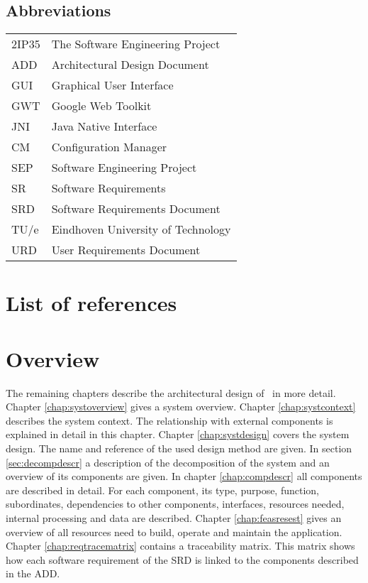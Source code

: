 \subsection{Abbreviations}
\begin{tabular}{l|l}
2IP35 & The Software Engineering Project \\
ADD & Architectural Design Document \\
GUI & Graphical User Interface \\
GWT & Google Web Toolkit \\
JNI & Java Native Interface \\
CM    & Configuration Manager \\
SEP   & Software Engineering Project \\
SR    & Software Requirements \\
SRD   & Software Requirements Document \\
TU/e  & Eindhoven University of Technology \\
URD   & User Requirements Document \\
\end{tabular}

\section{List of references}


\section{Overview}
The remaining chapters describe the architectural design of \projectname\ in more detail. Chapter \ref{chap:systoverview} gives a system overview. Chapter \ref{chap:systcontext} describes the system context. The relationship with external components is explained in detail in this chapter. Chapter \ref{chap:systdesign} covers the system design. The name and reference of the used design method are given. In section \ref{sec:decompdescr} a description of the decomposition of the system and an overview of its components are given.
In chapter \ref{chap:compdescr} all components are described in detail. For each component, its type, purpose, function, subordinates, dependencies to other components, interfaces, resources needed, internal processing and  data are described. Chapter \ref{chap:feasresest} gives an overview of all resources need to build, operate and maintain the application. Chapter \ref{chap:reqtracematrix} contains a traceability matrix. This matrix shows how each software requirement of the SRD \cite{srd} is linked to the components described in the ADD.


